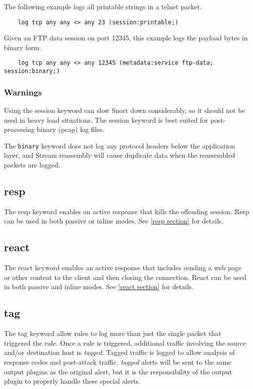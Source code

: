 \documentclass[english]{report}
\begin{document}
The following example logs all printable strings in a telnet packet.

\begin{verbatim}
    log tcp any any <> any 23 (session:printable;)
\end{verbatim}

Given an FTP data session on port 12345, this example logs the payload bytes
in binary form.

\begin{verbatim}
    log tcp any any <> any 12345 (metadata:service ftp-data; session:binary;)
\end{verbatim}

\subsubsection{Warnings}

Using the session keyword can slow Snort down considerably, so it should not be
used in heavy load situations. The session keyword is best suited for
post-processing binary (pcap) log files.

The \texttt{binary} keyword does not log any protocol headers below the
application layer, and Stream reassembly will cause duplicate data when
the reassembled packets are logged.

\subsection{resp}

The resp keyword enables an active response that kills the offending session.
Resp can be used in both passive or inline modes.  See \ref{resp section} for
details.

\subsection{react}

The react keyword enables an active response that includes sending a web page
or other content to the client and then closing the connection.  React can be
used in both passive and inline modes.  See \ref{react section} for details.

\subsection{tag}
\label{tag section}

The tag keyword allow rules to log more than just the single packet that
triggered the rule. Once a rule is triggered, additional traffic involving the
source and/or destination host is \emph{tagged}. Tagged traffic is logged to
allow analysis of response codes and post-attack traffic.  \emph{tagged} alerts
will be sent to the same output plugins as the original alert, but it is the
responsibility of the output plugin to properly handle these special alerts.
\end{document}
